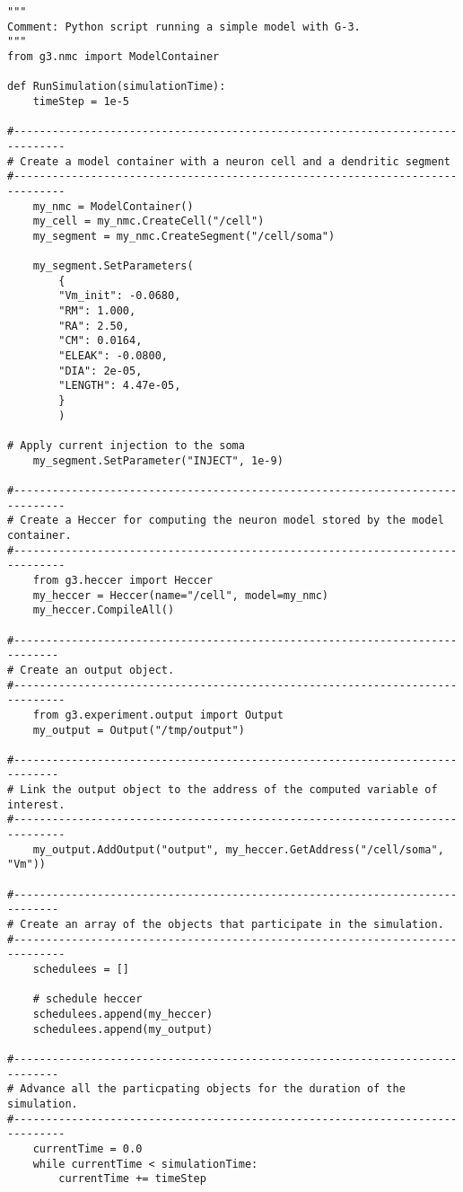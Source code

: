 \documentclass[10pt]{article}
\begin{document}
\begin{verbatim}
"""
Comment: Python script running a simple model with G-3.
"""
from g3.nmc import ModelContainer

def RunSimulation(simulationTime):
    timeStep = 1e-5
    
#------------------------------------------------------------------------------
# Create a model container with a neuron cell and a dendritic segment
#------------------------------------------------------------------------------
    my_nmc = ModelContainer()
    my_cell = my_nmc.CreateCell("/cell")
    my_segment = my_nmc.CreateSegment("/cell/soma")

    my_segment.SetParameters(
        {
        "Vm_init": -0.0680,
        "RM": 1.000,
        "RA": 2.50,
        "CM": 0.0164,
        "ELEAK": -0.0800,
        "DIA": 2e-05,
        "LENGTH": 4.47e-05,
        }
        )

# Apply current injection to the soma
    my_segment.SetParameter("INJECT", 1e-9)

#------------------------------------------------------------------------------
# Create a Heccer for computing the neuron model stored by the model container.
#------------------------------------------------------------------------------
    from g3.heccer import Heccer
    my_heccer = Heccer(name="/cell", model=my_nmc)
    my_heccer.CompileAll()

#----------------------------------------------------------------------------- 
# Create an output object.
#------------------------------------------------------------------------------
    from g3.experiment.output import Output
    my_output = Output("/tmp/output")

#----------------------------------------------------------------------------- 
# Link the output object to the address of the computed variable of interest.
#------------------------------------------------------------------------------
    my_output.AddOutput("output", my_heccer.GetAddress("/cell/soma", "Vm"))

#----------------------------------------------------------------------------- 
# Create an array of the objects that participate in the simulation.
#------------------------------------------------------------------------------
    schedulees = []

    # schedule heccer
    schedulees.append(my_heccer)
    schedulees.append(my_output)

#----------------------------------------------------------------------------- 
# Advance all the particpating objects for the duration of the simulation.
#------------------------------------------------------------------------------
    currentTime = 0.0
    while currentTime < simulationTime:
        currentTime += timeStep


\end{verbatim}
\end{document}
